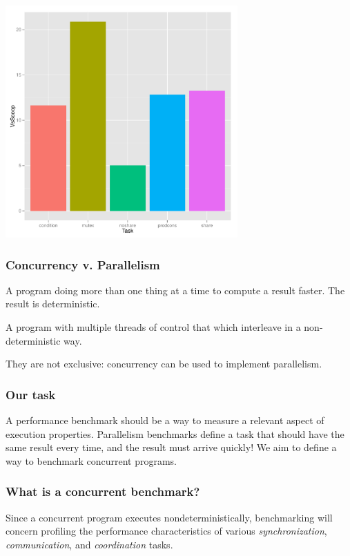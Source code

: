 \documentclass{beamer}
\newcommand{\skipp}[0]{\vskip 0.5cm}
\newcommand{\skippause}[0]{\skipp \pause}
\begin{document}
\begin{frame}
  \begin{center}
    \includegraphics[width=3.5in]{share-bar}
  \end{center}
\end{frame}

\begin{frame}
  \frametitle{Concurrency v. Parallelism}
  \begin{definition}[Parallelism]
    A program doing more than one thing at a time to compute a result faster.
    The result is deterministic.
  \end{definition}

  \begin{definition}[Concurrency]
    A program with multiple threads of control that which 
    interleave in a non-deterministic way.
  \end{definition}

  They are not exclusive: concurrency can be used to implement parallelism.
\end{frame}

\begin{frame}
  \frametitle {Our task}
  A performance benchmark should be a way to measure a relevant aspect
  of execution properties.
  \skippause
  Parallelism benchmarks define a task that should have the same result
  every time, and the result must arrive quickly!
  \skippause
  We aim to define a way to benchmark concurrent programs.
\end{frame}

\begin{frame}
  \frametitle{What is a concurrent benchmark?}
  Since a concurrent program executes nondeterministically,
  benchmarking will concern profiling the performance characteristics
  of various \emph{synchronization}, \emph{communication}, and \emph{coordination} 
  tasks.
\end{frame}
\end{document}
